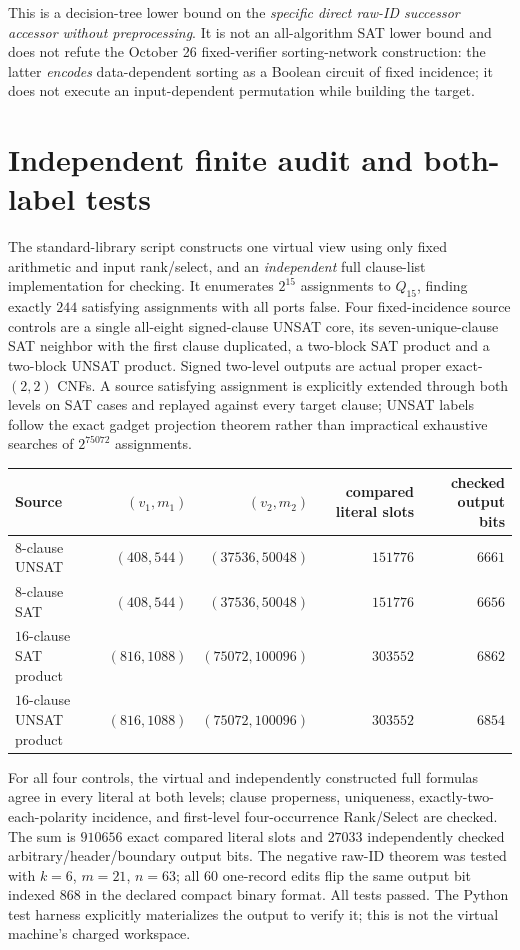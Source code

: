 \documentclass[11pt]{article}
\begin{document}
This is a decision-tree lower bound on the \emph{specific direct raw-ID successor accessor without preprocessing}. It is not an all-algorithm SAT lower bound and does not refute the October 26 fixed-verifier sorting-network construction: the latter \emph{encodes} data-dependent sorting as a Boolean circuit of fixed incidence; it does not execute an input-dependent permutation while building the target.

\section{Independent finite audit and both-label tests}
The standard-library script  constructs one virtual view using only fixed arithmetic and input rank/select, and an \emph{independent} full clause-list implementation for checking. It enumerates $2^{15}$ assignments to $Q_{15}$, finding exactly $244$ satisfying assignments with all ports false. Four fixed-incidence source controls are a single all-eight signed-clause UNSAT core, its seven-unique-clause SAT neighbor with the first clause duplicated, a two-block SAT product and a two-block UNSAT product. Signed two-level outputs are actual proper exact-$(2,2)$ CNFs. A source satisfying assignment is explicitly extended through both levels on SAT cases and replayed against every target clause; UNSAT labels follow the exact gadget projection theorem rather than impractical exhaustive searches of $2^{75072}$ assignments.

\begin{center}\small
\begin{tabular}{lrrrr}
\toprule
Source & $(v_1,m_1)$ & $(v_2,m_2)$ & compared literal slots & checked output bits\\\midrule
$8$-clause UNSAT & $(408,544)$ & $(37536,50048)$ & $151776$ & $6661$\\
$8$-clause SAT & $(408,544)$ & $(37536,50048)$ & $151776$ & $6656$\\
$16$-clause SAT product & $(816,1088)$ & $(75072,100096)$ & $303552$ & $6862$\\
$16$-clause UNSAT product & $(816,1088)$ & $(75072,100096)$ & $303552$ & $6854$\\\bottomrule
\end{tabular}
\end{center}
For all four controls, the virtual and independently constructed full formulas agree in every literal at both levels; clause properness, uniqueness, exactly-two-each-polarity incidence, and first-level four-occurrence Rank/Select are checked. The sum is $910656$ exact compared literal slots and $27033$ independently checked arbitrary/header/boundary output bits. The negative raw-ID theorem was tested with $k=6$, $m=21$, $n=63$; all $60$ one-record edits flip the same output bit indexed $868$ in the declared compact binary format. All tests passed. The Python test harness explicitly materializes the output to verify it; this is not the virtual machine's charged workspace.
\end{document}
